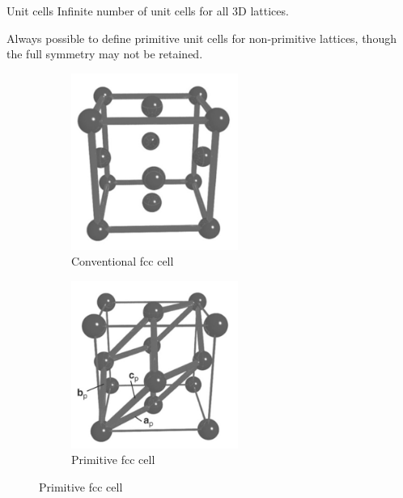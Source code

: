 \documentclass[aspectratio=169]{beamer}
\begin{document}
    \begin{frame}{Unit cells}
        Infinite number of unit cells for all 3D lattices.

        Always possible to define primitive unit cells for non-primitive lattices, though the full symmetry may not be retained.

        \begin{figure}
            \centering
            \begin{subfigure}{0.45\textwidth}
                \centering
                \includegraphics[width=0.6\textwidth]{lectures/figures/7_conventional_unit_cell.png}
                \caption{Conventional fcc cell}
            \end{subfigure}
            \begin{subfigure}{0.45\textwidth}
                \centering
                \includegraphics[width=0.6\textwidth]{lectures/figures/7_primitive_unit_cell.png}
                \caption{Primitive fcc cell}
            \end{subfigure}
        \end{figure}
    \end{frame}
\end{document}
